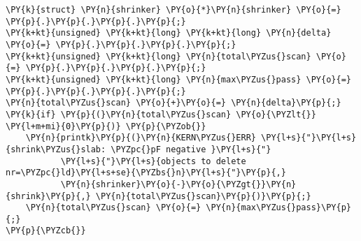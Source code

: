 \begin{Verbatim}[commandchars=\\\{\},codes={\catcode`\$=3\catcode`\^=7\catcode`\_=8}]
\PY{k}{struct} \PY{n}{shrinker} \PY{o}{*}\PY{n}{shrinker} \PY{o}{=} \PY{p}{.}\PY{p}{.}\PY{p}{.}\PY{p}{;}
\PY{k+kt}{unsigned} \PY{k+kt}{long} \PY{k+kt}{long} \PY{n}{delta} \PY{o}{=} \PY{p}{.}\PY{p}{.}\PY{p}{.}\PY{p}{;}
\PY{k+kt}{unsigned} \PY{k+kt}{long} \PY{n}{total\PYZus{}scan} \PY{o}{=} \PY{p}{.}\PY{p}{.}\PY{p}{.}\PY{p}{;}
\PY{k+kt}{unsigned} \PY{k+kt}{long} \PY{n}{max\PYZus{}pass} \PY{o}{=} \PY{p}{.}\PY{p}{.}\PY{p}{.}\PY{p}{;}
\PY{n}{total\PYZus{}scan} \PY{o}{+}\PY{o}{=} \PY{n}{delta}\PY{p}{;}
\PY{k}{if} \PY{p}{(}\PY{n}{total\PYZus{}scan} \PY{o}{\PYZlt{}} \PY{l+m+mi}{0}\PY{p}{)} \PY{p}{\PYZob{}}
    \PY{n}{printk}\PY{p}{(}\PY{n}{KERN\PYZus{}ERR} \PY{l+s}{"}\PY{l+s}{shrink\PYZus{}slab: \PYZpc{}pF negative }\PY{l+s}{"}
           \PY{l+s}{"}\PY{l+s}{objects to delete nr=\PYZpc{}ld}\PY{l+s+se}{\PYZbs{}n}\PY{l+s}{"}\PY{p}{,}
           \PY{n}{shrinker}\PY{o}{-}\PY{o}{\PYZgt{}}\PY{n}{shrink}\PY{p}{,} \PY{n}{total\PYZus{}scan}\PY{p}{)}\PY{p}{;}
    \PY{n}{total\PYZus{}scan} \PY{o}{=} \PY{n}{max\PYZus{}pass}\PY{p}{;}
\PY{p}{\PYZcb{}}
\end{Verbatim}
